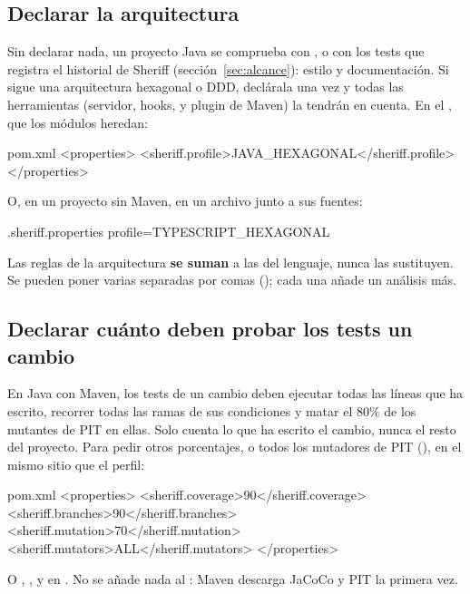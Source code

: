 \documentclass[11pt,a4paper]{article}
\begin{document}
\subsection{Declarar la arquitectura}\label{sec:perfil}

Sin declarar nada, un proyecto Java se comprueba con , o con los
tests que registra el historial de Sheriff (sección~\ref{sec:alcance}): estilo
y documentación. Si sigue una arquitectura hexagonal o DDD, declárala una vez y
todas las herramientas (servidor, hooks,  y plugin de Maven) la
tendrán en cuenta. En el , que los módulos heredan:

\begin{command}{pom.xml}
<properties>
  <sheriff.profile>JAVA_HEXAGONAL</sheriff.profile>
</properties>
\end{command}

O, en un proyecto sin Maven, en un archivo  junto a
sus fuentes:

\begin{command}{.sheriff.properties}
profile=TYPESCRIPT_HEXAGONAL
\end{command}

Las reglas de la arquitectura \textbf{se suman} a las del lenguaje, nunca las
sustituyen. Se pueden poner varias separadas por comas
(); cada una añade un análisis más.

\subsection{Declarar cuánto deben probar los tests un cambio}\label{sec:cobertura}

En Java con Maven, los tests de un cambio deben ejecutar todas las líneas que
ha escrito, recorrer todas las ramas de sus condiciones y matar el 80\% de los
mutantes de PIT en ellas. Solo cuenta lo que ha escrito el cambio, nunca el
resto del proyecto. Para pedir otros porcentajes, o todos los mutadores de PIT
(), en el mismo sitio que el perfil:

\begin{command}{pom.xml}
<properties>
  <sheriff.coverage>90</sheriff.coverage>
  <sheriff.branches>90</sheriff.branches>
  <sheriff.mutation>70</sheriff.mutation>
  <sheriff.mutators>ALL</sheriff.mutators>
</properties>
\end{command}

O , ,  y  en
. No se
añade nada al : Maven descarga JaCoCo y PIT la primera vez.
\end{document}
